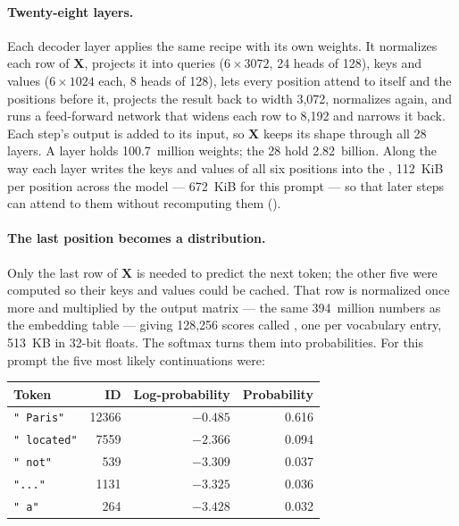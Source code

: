 \paragraph{Twenty-eight layers.} Each decoder layer applies the same recipe
with its own weights. It normalizes each row of $\mathbf{X}$, projects it into
queries ($6 \times 3072$, 24 heads of 128), keys and values ($6 \times 1024$
each, 8 heads of 128), lets every position attend to itself and the positions
before it, projects the result back to width 3,072, normalizes again, and runs
a feed-forward network that widens each row to 8,192 and narrows it back. Each
step's output is added to its input, so $\mathbf{X}$ keeps its shape through
all 28 layers. A layer holds 100.7~million weights; the 28 hold 2.82~billion.
Along the way each layer writes the keys and values of all six positions into
the , 112~KiB per position across the model --- 672~KiB for this
prompt --- so that later steps can attend to them without recomputing them
().

\paragraph{The last position becomes a distribution.} Only the last row of
$\mathbf{X}$ is needed to predict the next token; the other five were computed
so their keys and values could be cached. That row is normalized once more and
multiplied by the output matrix --- the same 394~million numbers as the
embedding table --- giving 128,256 scores called , one per
vocabulary entry, 513~KB in 32-bit floats. The softmax turns them into
probabilities. For this prompt the five most likely continuations were:

\begin{center}\small
\begin{tabular}{@{}lrrr@{}}
\toprule
Token & ID & Log-probability & Probability \\
\midrule
\texttt{" Paris"} & 12366 & $-0.485$ & 0.616 \\
\texttt{" located"} & 7559 & $-2.366$ & 0.094 \\
\texttt{" not"} & 539 & $-3.309$ & 0.037 \\
\texttt{"..."} & 1131 & $-3.325$ & 0.036 \\
\texttt{" a"} & 264 & $-3.428$ & 0.032 \\
\bottomrule
\end{tabular}
\end{center}


